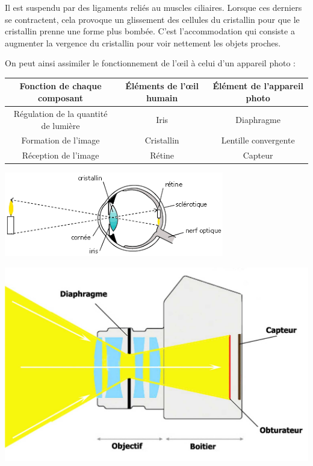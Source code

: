 \documentclass[12pt, a4paper]{report}
\begin{document}
Il est suspendu par des ligaments reliés au muscles ciliaires. Lorsque ces derniers se contractent, cela provoque un glissement des cellules du cristallin pour que le cristallin prenne une forme plus bombée. C'est l'accommodation qui consiste a augmenter la vergence du cristallin pour voir nettement les objets proches.

On peut ainsi assimiler le fonctionnement de l'\oe il à celui d'un appareil photo :
{\small}
\begin{center}
\begin{tabular}{|c|c|c|}
\hline Fonction de chaque composant & \'{E}léments de l'\oe il humain & \'{E}lément de l'appareil photo\\\hline
Régulation de la quantité de lumière& Iris & Diaphragme \\\hline
Formation de l'image & Cristallin & Lentille convergente \\\hline
Réception de l'image & Rétine & Capteur \\\hline
\end{tabular}
\end{center}
{\small}

\begin{center}
\includegraphics[scale=0.8]{schema_oeil.png}
\end{center}

\begin{center}
\includegraphics[scale=0.16]{appareil.jpg}
\end{center}
\end{document}
